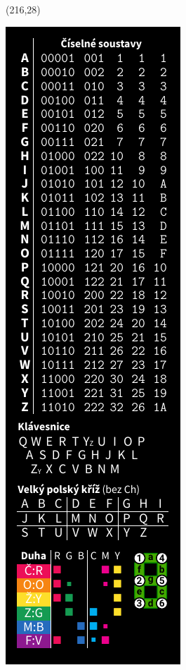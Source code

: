 \documentclass{extarticle}
\begin{document}
\begin{textblock}{42}(216,28)
\vfill
{\centerline{\includegraphics[scale=1,]{back.pdf}}} 
\vfill
\end{textblock}
\end{document}

